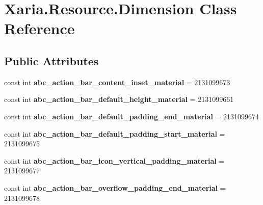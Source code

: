 \hypertarget{classXaria_1_1Resource_1_1Dimension}{}\section{Xaria.\+Resource.\+Dimension Class Reference}
\label{classXaria_1_1Resource_1_1Dimension}
\subsection*{Public Attributes}
\begin{DoxyCompactItemize}
\item 
\mbox{\label{classXaria_1_1Resource_1_1Dimension_a898581b37ead4d72d07ab188c203be11}} 
const int {\bfseries abc\+\_\+action\+\_\+bar\+\_\+content\+\_\+inset\+\_\+material} = 2131099673
\item 
\mbox{\label{classXaria_1_1Resource_1_1Dimension_a0eb9052c94a0ef5972fea6f613dbd8e4}} 
const int {\bfseries abc\+\_\+action\+\_\+bar\+\_\+default\+\_\+height\+\_\+material} = 2131099661
\item 
\mbox{\label{classXaria_1_1Resource_1_1Dimension_a87a0c4544a94a671acb3eff0aceb93b3}} 
const int {\bfseries abc\+\_\+action\+\_\+bar\+\_\+default\+\_\+padding\+\_\+end\+\_\+material} = 2131099674
\item 
\mbox{\label{classXaria_1_1Resource_1_1Dimension_ae37f8128075aefca7c4442c9577f1af9}} 
const int {\bfseries abc\+\_\+action\+\_\+bar\+\_\+default\+\_\+padding\+\_\+start\+\_\+material} = 2131099675
\item 
\mbox{\label{classXaria_1_1Resource_1_1Dimension_a5a4e25bf774ac09db88663683245dfde}} 
const int {\bfseries abc\+\_\+action\+\_\+bar\+\_\+icon\+\_\+vertical\+\_\+padding\+\_\+material} = 2131099677
\item 
\mbox{\label{classXaria_1_1Resource_1_1Dimension_af59c767dece3a713c9da223842905015}} 
const int {\bfseries abc\+\_\+action\+\_\+bar\+\_\+overflow\+\_\+padding\+\_\+end\+\_\+material} = 2131099678
\item 

\end{DoxyCompactItemize}

